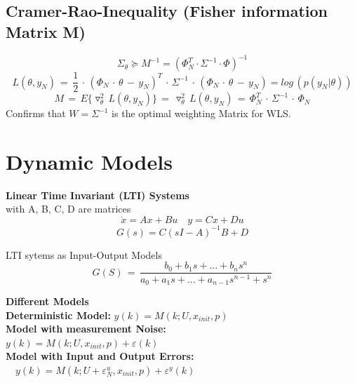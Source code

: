 \subsection*{Cramer-Rao-Inequality (Fisher information Matrix M)}
\begin{equation*}
{ \Sigma  }_{ \theta  } \succeq M^{-1} = (\Phi^T_N \cdot \Sigma^{-1} \cdot \Phi)^{-1}
\end{equation*}
\begin{equation*}
L(\theta ,y_{ N })\, =\, \frac { 1 }{ 2 } \, \cdot \, (\Phi _{ N }\, \cdot \, \theta \, -\, y_N)^{ T } \, \cdot \, \Sigma^{-1} \, \cdot \,  (\Phi_N \, \cdot \, \theta \, - \, y_N) =log\, (p({ y }_{ N }|\theta))
\end{equation*}
\begin{equation*}
M\, =\, { E }\{ \triangledown ^{ 2 }_{ \theta  }\, L(\theta ,y_{ N })\} \, =\, \triangledown ^{ 2 }_{ \theta  }\, L(\theta ,y_{ N })\, =\, \Phi _{ N }^{ T }\, \cdot \, \Sigma ^{ -1 }\, \cdot \, \Phi _{ N }
\end{equation*}
Confirms that $W = \Sigma^{-1}$ is the optimal weighting Matrix for WLS.
\section*{Dynamic Models}
\textbf{Linear Time Invariant (LTI) Systems}\\
with A, B, C, D are matrices
\begin{equation*}
\dot { x } =Ax+Bu \quad y=Cx+Du 
\end{equation*}
\begin{equation*}
G(s)=C{ (sI-A) }^{ -1 }B+D
\end{equation*}

LTI sytems as Input-Output Models
\begin{equation*}
G(S)\, =\, \frac { b_0 + b_1s+...+b_ns^n }{ a_0+a_1s+...+a_{n-1}s^{n-1}+s^n } 
\end{equation*}

\textbf{Different Models}\\
\textbf{Deterministic Model:} \(y(k)=M(k;U,{ x }_{ init },p)\) \\
\textbf{Model with measurement Noise:} \\ \(y(k)=M(k;U,{ x }_{ init },p)+\varepsilon(k)\) \\
\textbf{Model with Input and Output Errors:} \\ \( \quad y(k)=M(k;U+{\varepsilon  }_{ N }^{ u },{ x }_{ init },p)+{ { \varepsilon }^{ y } }(k)\)


